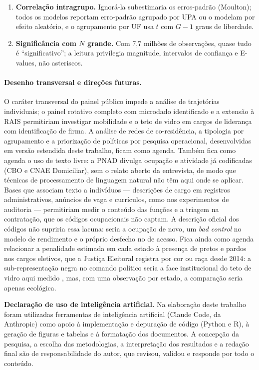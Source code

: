 \documentclass[12pt, a4paper, oneside]{article}
\begin{document}
\begin{enumerate}
    regressão na amostra. A robustez ponderada pelo peso da PNAD muda o gap em cerca de
    meio ponto percentual.
  \item \textbf{Correlação intragrupo.} Ignorá-la subestimaria os erros-padrão (Moulton);
    todos os modelos reportam erro-padrão agrupado por UPA ou o modelam por efeito
    aleatório, e o agrupamento por UF usa $t$ com $G-1$ graus de liberdade.
  \item \textbf{Significância com $N$ grande.} Com 7{,}7 milhões de observações, quase tudo é
    ``significativo''; a leitura privilegia magnitude, intervalos de confiança e E-values,
    não asteriscos.
\end{enumerate}

\paragraph{Desenho transversal e direções futuras.}
O caráter transversal do painel público impede a análise de trajetórias
individuais; o painel rotativo completo com microdado identificado e a extensão
à RAIS permitiriam investigar mobilidade e o teto de vidro em cargos de liderança
com identificação de firma. A análise de redes de co-residência, a tipologia
por agrupamento e a priorização de políticas por pesquisa operacional,
desenvolvidas em versão estendida deste trabalho, ficam como agenda. Também fica
como agenda o uso de texto livre: a PNAD divulga ocupação e atividade já codificadas
(CBO e CNAE Domiciliar), sem o relato aberto da entrevista, de modo que técnicas de
processamento de linguagem natural não têm aqui onde se aplicar. Bases que associam
texto a indivíduos --- descrições de cargo em registros administrativos, anúncios de
vaga e currículos, como nos experimentos de auditoria \cite{pager2007} --- permitiriam
medir o conteúdo das funções e a triagem na contratação, que os códigos ocupacionais
não captam. A descrição oficial dos códigos não supriria essa lacuna: seria a
ocupação de novo, um \emph{bad control} no modelo de rendimento e o próprio desfecho
no de acesso. Fica ainda como agenda relacionar a penalidade estimada em cada estado
à presença de pretos e pardos nos cargos eletivos, que a Justiça Eleitoral registra
por cor ou raça desde 2014: a sub-representação negra no comando político seria a
face institucional do teto de vidro aqui medido \cite{almeida2019}, mas, com uma
observação por estado, a comparação seria apenas ecológica.

\bigskip

\noindent\textbf{Declaração de uso de inteligência artificial.}
Na elaboração deste trabalho foram utilizadas ferramentas de inteligência
artificial (Claude Code, da Anthropic) como apoio à implementação e depuração de
código (Python e R), à geração de figuras e tabelas e à formatação dos documentos.
A concepção da pesquisa, a escolha das metodologias, a interpretação dos resultados
e a redação final são de responsabilidade do autor, que revisou, validou e responde
por todo o conteúdo.

\newpage

\end{document}
